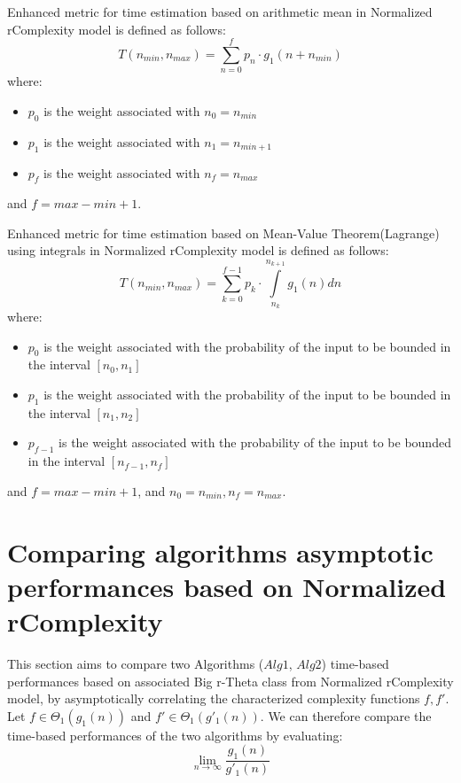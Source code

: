 \begin{definition} Enhanced metric for time estimation based on arithmetic mean in Normalized rComplexity model is defined as follows:
\[  T(n_{min}, n_{max}) = \sum\limits_{n=0}^{f} p_{n} \cdot g_{1}(n + n_{min})  \]
where:
\begin{itemize}
	\item $p_{0}$ is the weight associated with $n_{0} = n_{min}$
	\item $p_{1}$ is the weight associated with $n_{1} = n_{min + 1}$
	\item $p_{f}$ is the weight associated with $n_{f} = n_{max}$
\end{itemize}
and $f = max - min + 1$.
\end{definition}

\begin{definition} Enhanced metric for time estimation based on Mean-Value Theorem(Lagrange) using integrals in Normalized rComplexity model is defined as follows:
\[  T(n_{min}, n_{max}) =\sum\limits_{k=0}^{f-1} p_{k} \cdot \int\limits_{n_{k}}^{n_{k+1}} g_{1}(n) dn  \]
where:
\begin{itemize}
	\item $p_{0}$ is the weight associated with the probability of the input to be bounded in the interval $[n_{0}, n_{1}]$
	\item $p_{1}$ is the weight associated with the probability of the input to be bounded in the interval $[n_{1}, n_{2}]$
	\item $p_{f-1}$ is the weight associated with the probability of the input to be bounded in the interval $[n_{f-1}, n_{f}]$
\end{itemize}
and $f = max - min + 1$, and $n_{0} = n_{min}, n_{f} = n_{max}$.
\end{definition}

\section{Comparing algorithms asymptotic performances based on Normalized rComplexity}



This section aims to compare two Algorithms ($Alg1$, $Alg2$) time-based performances based on associated Big r-Theta class from Normalized rComplexity model, by asymptotically correlating the characterized complexity functions $f, f'$. \\
Let $f \in \Theta_{1}(g_{1}(n))$ and $f' \in \Theta_{1}(g'_{1}(n))$.
We can therefore compare the time-based performances of the two algorithms by evaluating:  \[\lim_{n\to\infty} \dfrac{g_{1}(n)}{g'_{1}(n)}\]

